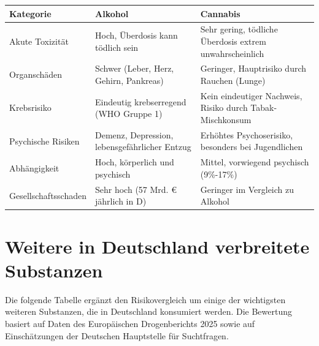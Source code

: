 \documentclass[11pt,a4paper]{article}
\begin{document}
	\begin{table}[h!]
		\centering
		\small                     %
		\begin{tabularx}{\textwidth}{@{} l X X @{}}
			\toprule
			\textbf{Kategorie} & \textbf{Alkohol} & \textbf{Cannabis} \\ \midrule
			Akute Toxizität  & Hoch, Überdosis kann tödlich sein & Sehr gering, tödliche Überdosis extrem unwahrscheinlich\cite{nida-no-overdose} \\
			Organschäden      & Schwer (Leber, Herz, Gehirn, Pankreas) & Geringer, Hauptrisiko durch Rauchen (Lunge) \\
			Krebsrisiko       & Eindeutig krebserregend (WHO Gruppe 1)\cite{who-carcinogen} & Kein eindeutiger Nachweis, Risiko durch Tabak-Mischkonsum \\
			Psychische Risiken & Demenz, Depression, lebensgefährlicher Entzug & Erhöhtes Psychoserisiko, besonders bei Jugendlichen\cite{cannabis-psychosis} \\
			Abhängigkeit      & Hoch, körperlich und psychisch\cite{dhs-abhaengigkeit} & Mittel, vorwiegend psychisch (9\%-17\%)\cite{dhs-cannabis-abhaengigkeit} \\
			Gesellschaftsschaden & Sehr hoch (57 Mrd. € jährlich in D)\cite{dhs-costs} & Geringer im Vergleich zu Alkohol \\ \bottomrule
		\end{tabularx}
	\end{table}
	
	\section{Weitere in Deutschland verbreitete Substanzen}
	
	Die folgende Tabelle ergänzt den Risikovergleich um einige der wichtigsten weiteren Substanzen, die in Deutschland konsumiert werden. Die Bewertung basiert auf Daten des Europäischen Drogenberichts 2025\cite{euda-2025} sowie auf Einschätzungen der Deutschen Hauptstelle für Suchtfragen\cite{dhs-drugprofiles}.
	
\end{document}
